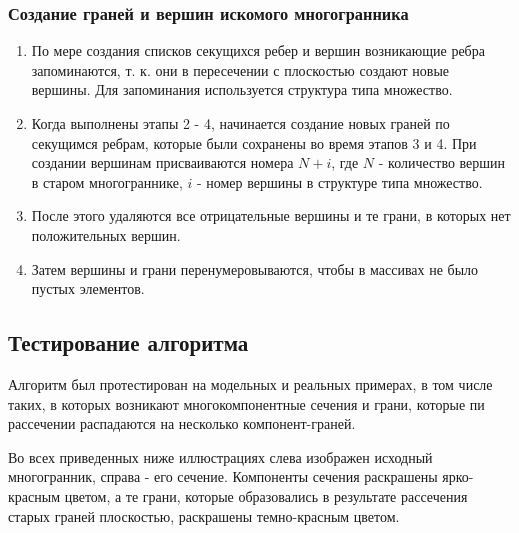 \documentclass[a4paper,12pt, titlepage]{article}
\begin{document}
\subsubsection{Создание граней и вершин искомого многогранника}	
	\begin{flushleft}
		\begin{enumerate}
			\item По мере создания списков секущихся ребер и вершин возникающие ребра запоминаются, 
			т. к. они в пересечении с плоскостью создают новые вершины. Для запоминания используется 
			структура типа множество. 
			\item Когда выполнены этапы 2 - 4, начинается создание новых граней по секущимся ребрам,
			которые были сохранены во время этапов 3 и 4. При создании вершинам присваиваются номера
			$N + i$, где $N$ - количество вершин в старом многограннике, $i$ - номер вершины в 
			структуре типа множество.
			\item После этого удаляются все отрицательные вершины и те грани, в которых нет 
			положительных вершин.
			\item Затем вершины и грани перенумеровываются, чтобы в массивах не было пустых элементов.
		\end{enumerate}
	\end{flushleft}

\subsection{Тестирование алгоритма}
	\begin{flushleft}
		Алгоритм был протестирован на модельных и реальных примерах, в том числе таких, в которых
		возникают многокомпонентные сечения и грани, которые пи рассечении распадаются на несколько
		компонент-граней.
	\end{flushleft}
	\begin{flushleft}
		Во всех приведенных ниже иллюстрациях слева изображен исходный многогранник, справа - его 
		сечение. Компоненты сечения раскрашены ярко-красным цветом, а те грани, которые образовались
		в результате рассечения старых граней плоскостью, раскрашены темно-красным цветом.
	\end{flushleft}
\end{document}
